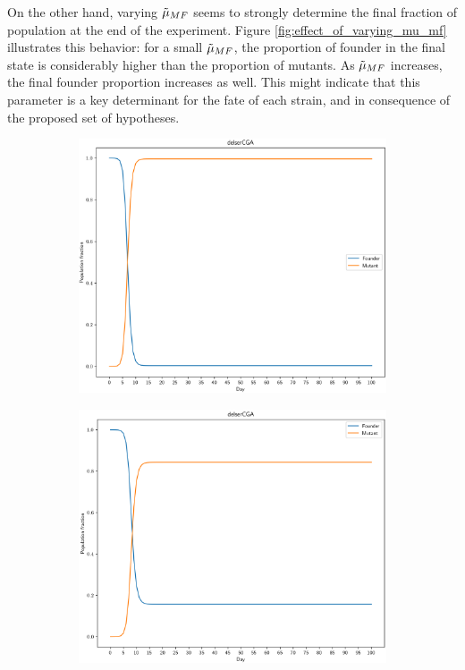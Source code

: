 \documentclass[10pt,a4paper]{scrartcl}
\begin{document}
On the other hand, varying $\Tilde{\mu}_{MF}$ seems to strongly determine the final fraction of population at the end of the experiment. Figure \ref{fig:effect_of_varying_mu_mf} illustrates this behavior: for a small $\Tilde{\mu}_{MF}$, the proportion of founder in the final state is considerably higher than the proportion of mutants. As $\Tilde{\mu}_{MF}$ increases, the final founder proportion increases as well. This might indicate that this parameter is a key determinant for the fate of each strain, and in consequence of the proposed set of hypotheses. 

\begin{figure}
    \centering
    \begin{subfigure}[b]{0.4\textwidth}
    \centering
    \includegraphics[scale=0.4]{plots/two_state_small_mu_mf.png}
    \end{subfigure}
    \hfill
    \begin{subfigure}[b]{0.4\textwidth}
    \centering
    \includegraphics[scale=0.4]{plots/two_state_big_mu_mf.png}

\end{subfigure}
\end{figure}
\end{document}
